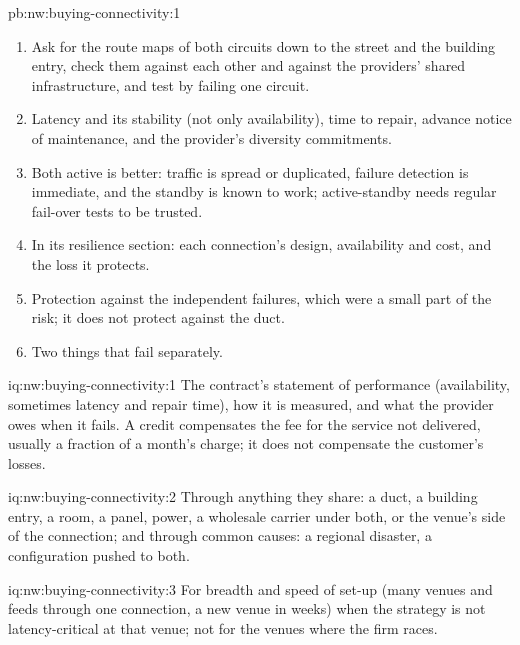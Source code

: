 \begin{solution}{pb:nw:buying-connectivity:1}
\begin{enumerate}[resume]
\item Ask for the route maps of both circuits down to the street and the building entry, check them against each other and against the
  providers' shared infrastructure, and test by failing one circuit.
\item Latency and its stability (not only availability), time to repair, advance notice of maintenance, and the provider's diversity commitments.
\item Both active is better: traffic is spread or duplicated, failure detection is immediate, and the standby is known to work; active-standby
  needs regular fail-over tests to be trusted.
\item In its resilience section: each connection's design, availability and cost, and the loss it protects.
\item Protection against the independent failures, which were a small part of the risk; it does not protect against the duct.
\item Two things that fail separately.
\end{enumerate}
\end{solution}

\begin{solution}{iq:nw:buying-connectivity:1}
The contract's statement of performance (availability, sometimes latency and repair time), how it is measured, and what the provider owes when
it fails. A credit compensates the fee for the service not delivered, usually a fraction of a month's charge; it does not compensate the customer's
losses.
\end{solution}

\begin{solution}{iq:nw:buying-connectivity:2}
Through anything they share: a duct, a building entry, a room, a panel, power, a wholesale carrier under both, or the venue's side of the connection;
and through common causes: a regional disaster, a configuration pushed to both.
\end{solution}

\begin{solution}{iq:nw:buying-connectivity:3}
For breadth and speed of set-up (many venues and feeds through one connection, a new venue in weeks) when the strategy is not latency-critical at
that venue; not for the venues where the firm races.
\end{solution}

